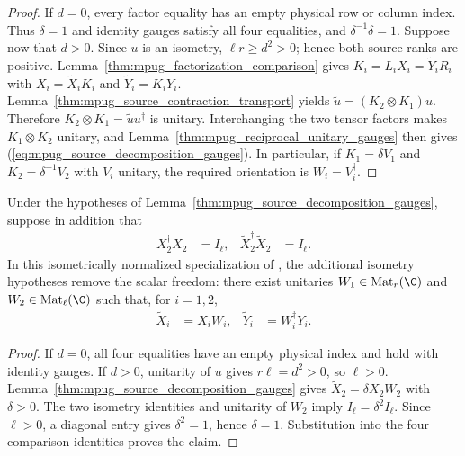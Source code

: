\begin{proof}\leanok
    If $d=0$, every factor equality has an empty physical row or column
    index. Thus $\delta=1$ and identity gauges satisfy all four
    equalities, and $\delta^{-1}\delta=1$.
    Suppose now that $d>0$. Since $u$ is an isometry,
    $\ell r\geq d^2>0$; hence both
    source ranks are positive. Lemma~\ref{thm:mpug_factorization_comparison}
    gives $K_i=L_iX_i=\widetilde Y_iR_i$ with
    $X_i=\widetilde X_iK_i$ and $\widetilde Y_i=K_iY_i$.
    Lemma~\ref{thm:mpug_source_contraction_transport} yields
    $\widetilde u=(K_2\otimes K_1)u$. Therefore
    $K_2\otimes K_1=\widetilde u u^\dagger$ is unitary.
    Interchanging the two tensor factors makes $K_1\otimes K_2$ unitary, and
    Lemma~\ref{thm:mpug_reciprocal_unitary_gauges} then gives
    (\ref{eq:mpug_source_decomposition_gauges}). In particular, if
    $K_1=\delta V_1$ and $K_2=\delta^{-1}V_2$ with $V_i$ unitary,
    the required orientation is $W_i=V_i^\dagger$.
\end{proof}

\begin{corollary}
    \label{cor:mpug_normalized_source_decomposition_gauges}
    \leanok
    Under the hypotheses of Lemma~\ref{thm:mpug_source_decomposition_gauges},
    suppose in addition that
    \begin{align}
        X_2^\dagger X_2 & =I_\ell,
                        & \widetilde X_2^\dagger\widetilde X_2 & =I_\ell.
    \end{align}
    In this isometrically normalized specialization of
    \cite[lines~1052--1066]{FrancoRubio2025MPUGauging}, the additional
    isometry hypotheses remove the scalar freedom: there exist unitaries
    $W_1\in\operatorname{Mat}_r(\C)$ and
    $W_2\in\operatorname{Mat}_\ell(\C)$ such that, for $i=1,2$,
    \begin{align}
        \widetilde X_i & =X_iW_i,
                       & \widetilde Y_i & =W_i^\dagger Y_i.
    \end{align}
\end{corollary}

\begin{proof}\leanok
    If $d=0$, all four equalities have an empty physical index and hold
    with identity gauges. If $d>0$, unitarity of $u$ gives $r\ell=d^2>0$,
    so $\ell>0$. Lemma~\ref{thm:mpug_source_decomposition_gauges} gives
    $\widetilde X_2=\delta X_2W_2$ with $\delta>0$. The two isometry
    identities and unitarity of $W_2$ imply
    $I_\ell=\delta^2I_\ell$. Since $\ell>0$, a diagonal entry gives
    $\delta^2=1$, hence $\delta=1$. Substitution into the four comparison
    identities proves the claim.
\end{proof}

